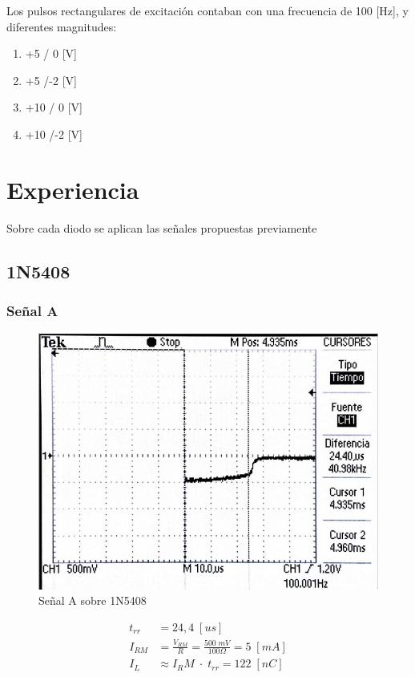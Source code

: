 \documentclass{article}
\begin{document}
Los pulsos rectangulares de excitación contaban con una frecuencia de 100 [Hz], y diferentes magnitudes:

\begin{enumerate}[label=(\Alph*)] \itemsep0em \itemindent=2em
\item +5  / 0 [V]
\item +5  /-2 [V]
\item +10 / 0 [V]
\item +10 /-2 [V]
\end{enumerate}

\clearpage

\section{Experiencia}
Sobre cada diodo se aplican las señales propuestas previamente
\subsection{1N5408}
\subsubsection{Señal A}
\begin{figure}[h!]
 \begin{center}
	\includegraphics[scale=0.4]{imagenes/1N5408_A.jpg} 
	\caption{Señal A sobre 1N5408}
 \end{center}
\end{figure}
\begin{align*}
	t_{rr} &= 24,4 \; [us] \\
	I_{RM}	&= \frac{V_{RM}}{R} = \frac{500 \; mV}{100 \Omega} = 5 \; [mA] \\
	I_L	&\approx {I_RM} \; \cdot \; t_{rr} = 122 \; [nC]
\end{align*}
%
\end{document}

